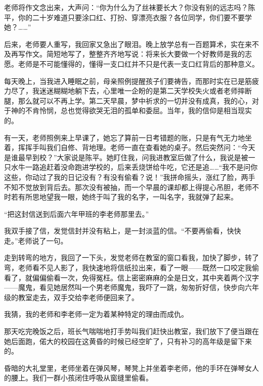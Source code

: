 \par 老师将作文念出来，大声问：“你为什么为了丝袜要长大？你没有别的远志吗？陈平，你的二十岁难道只要涂口红、打扮、穿漂亮衣服？各位同学，你们要不要学她？……”
\par 后来，老师要人重写，我回家又急出了眼泪。晚上放学总有一百题算术，实在来不及再写作文。简短地写了，整整齐齐地写说：将来长大要做一个好教师是我的志愿。老师是不可能懂得的，懂得一支口红并不只是代表一支口红背后的那种意义。
\par 每天晚上，当我进入睡眠之前，母亲照例提醒孩子们要祷告，而那时实在已是筋疲力尽了，我迷迷糊糊地躺下去，心里唯一企盼的是第二天学校失火或者老师摔断腿，那么就可以不再上学。第二天早晨，梦中祈求的一切并没有成真，我的心，对于神的不肯怜悯，总也觉得欲哭无泪的孤单和委屈。当年，我的信仰是相当现实的。
\par 有一天，老师照例来上早课了，她忘了算前一日考错题的账，只是有气无力地坐着，挥挥手叫我们自修、背地理。老师一直在查看她的桌子。然后突然问：“今天是谁最早到校？”大家说是陈平。她盯住我，问我进教室后做了什么，我说是被一只水牛一路追赶着没命跑进学校的，后来丢烧饼给牛吃，它还是追……“我不是问你这些，你动过了我的日记没有？有没有偷看？说！”我拼命摇头，涨红了脸，两手不知不觉放到背后去。那次没有被抽，而一个早晨的课却都上得提心吊胆，老师不时若有所思地望我一眼，她终于叫了我的名字，一叫名字，我就弹了起来。
\par “把这封信送到后面六年甲班的李老师那里去。”
\par 我双手接了信，发觉信封并没有粘上，是一封淡蓝的信。“不要再偷看，快快走。”老师说了一句。
\par 走到转弯的地方，我回了一下头，发觉老师在教室的窗口看我，加快了脚步，转了弯，老师看不见人影了，我快速地将信纸拉出来，看了一眼——既然一口咬定我偷看了，就偏偏偷看一次，免得冤枉。信上密密麻麻的全是日文，其中夹着两个汉字——魔鬼，看见她居然叫一个男老师魔鬼，我吓了一跳，匆匆折好信，快步向六年级的教室走去，双手交给李老师便回来了。
\par 我猜，我的老师和李老师一定为着某种特定的理由而成仇。
\par 那天吃完晚饭之后，班长气喘喘地打手势叫我们赶快出教室，我们放下了便当跟在她后面跑，偌大的校园在这黄昏的时候已经空旷了，只有补习的高年级是留下来的。
\par 昏暗的大礼堂里，老师坐着在弹风琴，琴凳上并坐着李老师，他的手环在弹琴女人的腰上。我们一群小孩闭住呼吸从窗缝里偷看。
